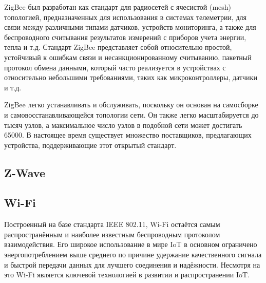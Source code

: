 	ZigBee был разработан как стандарт для радиосетей с ячесистой (mesh) топологией, предназначенных
	для использования в системах телеметрии, для связи между различными типами датчиков, устройств
	мониторинга, а также для беспроводного считывания результатов измерений с приборов учета энергии,
	тепла и т.д. Стандарт ZigBee представляет собой относительно простой, устойчивый к ошибкам связи и
	несанкционированному считыванию, пакетный протокол обмена данными, который часто реализуется в
	устройствах с относительно небольшими требованиями, таких как микроконтроллеры, датчики и т.д.
	
	ZigBee легко устанавливать и обслуживать, поскольку он основан на самосборке и самовосстанавливающейся
	топологии сети. Он также легко масштабируется до тысяч узлов, а максимальное число узлов в подобной сети
	может достигать 65000. В настоящее время существует множество поставщиков, предлагающих устройства,
	поддерживающие этот открытый стандарт.
	
	
	\subsection{Z-Wave}
	
	
	\subsection{Wi-Fi}
	Построенный на базе стандарта IEEE 802.11, Wi-Fi остаётся самым распространённым и наиболее
	известным беспроводным протоколом взаимодействия. Его широкое использование в мире IoT в
	основном ограничено энергопотреблением выше среднего по причине удержание качественного сигнала
	и быстрой передачи данных для лучшего соединения и надёжности. Несмотря на это Wi-Fi является
	ключевой технологией в развитии и распространении IoT.
	
	
	